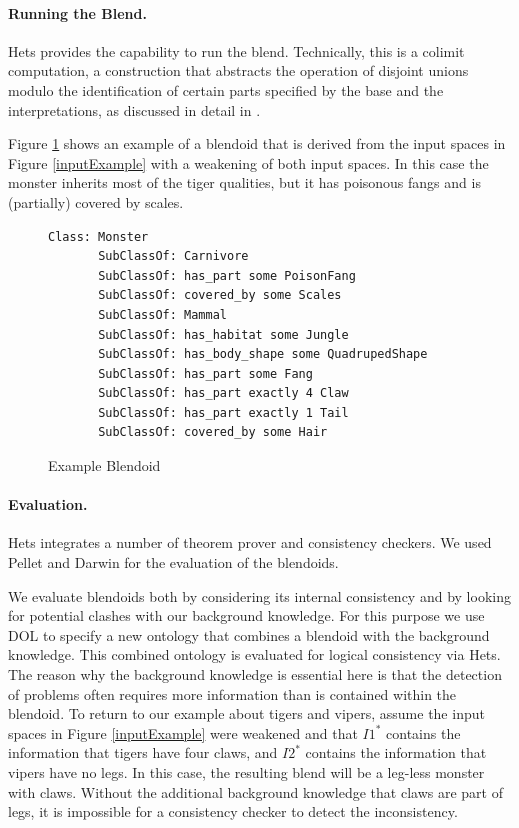 \documentclass[letterpaper]{article}
\begin{document}
\paragraph{Running the Blend.}
 Hets provides the capability to run the blend. Technically, this is a colimit computation,  a construction that abstracts the operation of disjoint unions modulo the identification of certain parts specified by the base and the interpretations, as discussed in detail in  \cite{Goguen03semioticmorphisms,hyper2010,blendingc3gi12}.

Figure \ref{exampleBlendoid} shows an example of a blendoid that is derived from the input spaces in Figure \ref{inputExample} with a weakening of both input spaces. In this case the monster inherits most of the tiger qualities, but it has poisonous fangs and  is (partially) covered by scales. 
 \begin{figure}[htbp]
\begin{lstlisting}[basicstyle=\ttfamily\scriptsize,language=dolText,morekeywords={props,excluding,ObjectProperty,Class,DisjointUnionOf,SubClassOf,Characteristics,Transitive,Asymmetric,SubPropertyOf,DisjointClasses,EquivalentTo,Asymmetric,inverse,only,forall,iff,if,or,exists,bridge,distributed},escapechar=@,mathescape,alsolanguage=owl2Manchester] 
Class: Monster
       SubClassOf: Carnivore
       SubClassOf: has_part some PoisonFang
       SubClassOf: covered_by some Scales
       SubClassOf: Mammal
       SubClassOf: has_habitat some Jungle
       SubClassOf: has_body_shape some QuadrupedShape
       SubClassOf: has_part some Fang
       SubClassOf: has_part exactly 4 Claw
       SubClassOf: has_part exactly 1 Tail
       SubClassOf: covered_by some Hair 
\end{lstlisting}
\caption{Example Blendoid}
\label{exampleBlendoid}
\end{figure}
\vspace{-2em}
  
\paragraph{Evaluation.}  \label{eval}
 Hets integrates a number of theorem prover and consistency checkers. 
 We used Pellet and Darwin for the evaluation of the blendoids. 
 
 
We evaluate blendoids both by considering its internal consistency and 
by looking for potential clashes with our background knowledge. For this purpose 
we use DOL to specify a new ontology that combines a blendoid with the background knowledge. 
This combined ontology is evaluated for logical consistency via Hets.  
The reason why the background knowledge is essential here is that   the detection of problems 
often requires more information than is contained within the blendoid.
 To return to our example about tigers and vipers, assume  
the input spaces in Figure \ref{inputExample} were weakened and that 
 $I1^*$ 
 contains the information that tigers have four claws,  and $I2^*$ contains
  the information that vipers have no legs. In this case, the resulting
   blend will be a leg-less monster with claws. Without the additional background 
   knowledge that claws are part of legs, it is impossible for a consistency checker to detect the inconsistency.  
\end{document}
